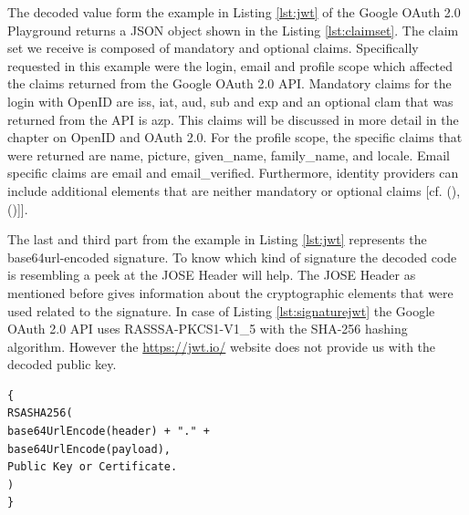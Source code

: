 The decoded value form the example in Listing \ref{lst:jwt} of the Google OAuth 2.0 Playground \cite{Google:2018:OAuthPlayground} returns a JSON object shown in the Listing \ref{lst:claimset}. The claim set we receive is composed of mandatory and optional claims. Specifically requested in this example were the login, email and profile scope which affected the claims returned from the Google OAuth 2.0 API. Mandatory claims for the login with OpenID are iss, iat, aud, sub and exp and an optional clam that was returned from the API is azp. This claims will be discussed in more detail in the chapter on OpenID and OAuth 2.0. For the profile scope, the specific claims that were returned are name, picture, given\_name, family\_name, and locale. Email specific claims are email and email\_verified. Furthermore, identity providers can include additional elements that are neither mandatory or optional claims [cf. ({\cite{Google:2018:OAuthPlayground}),(\cite{Siriwardena:JWTJWSJWE:2016})]}].

The last and third part from the example in  Listing \ref{lst:jwt}  represents the base64url-encoded signature. To know which kind of signature the decoded code is resembling a peek at the JOSE Header will help. The JOSE Header as mentioned before gives information about the cryptographic elements that were used related to the signature. In case of Listing \ref{lst:signaturejwt} the Google OAuth 2.0 API uses RASSSA-PKCS1-V1\_5 with the SHA-256 hashing algorithm. However the \href{https://jwt.io/} {https://jwt.io/} website does not provide us with the decoded public key. 

\begin{lstlisting}
{
RSASHA256(
base64UrlEncode(header) + "." +
base64UrlEncode(payload),
Public Key or Certificate.
)
}
\end{lstlisting}


